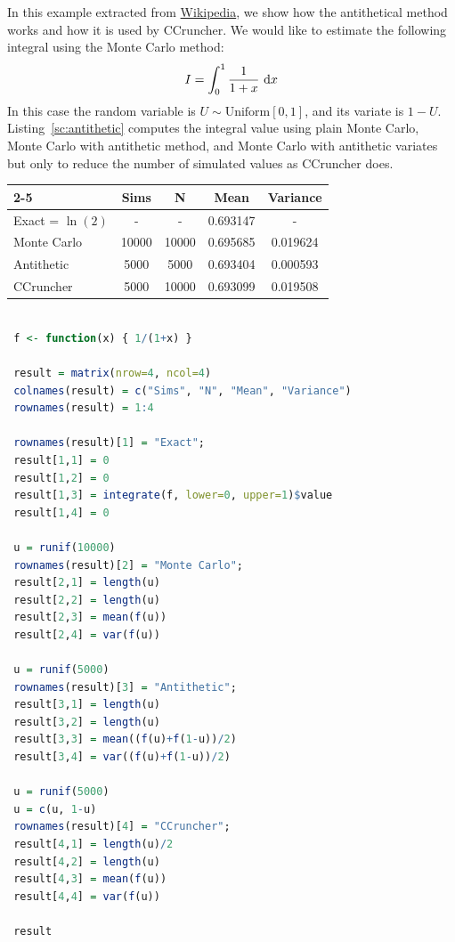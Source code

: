 \documentclass[11pt,fleqn]{book} %
\begin{document}
\begin{example}
	In this example extracted from 
	\href{http://en.wikipedia.org/wiki/Antithetic_variates}{Wikipedia}, we 
	show how the antithetical method works and how it is used by CCruncher. 
	We would like to estimate the following integral using the Monte Carlo 
	method:
	\begin{displaymath}
		I = \displaystyle \int_0^1 \frac{1}{1+x} \mathop{\,\mathrm{{}d}}\mathopen{} x
	\end{displaymath}
	In this case the random variable is $U \sim \text{Uniform}[0,1]$, and 
	its variate is $1-U$. Listing~\ref{sc:antithetic} computes the integral 
	value using plain Monte Carlo, Monte Carlo with antithetic method, and 
	Monte Carlo with antithetic variates but only to reduce the number of 
	simulated values as CCruncher does.
	\\
	\hspace*{1cm}
	\begin{tabular}{l|c|c|c|c|}
		\cline{2-5}
		& Sims & N & Mean & Variance \\
		\hline
		\multicolumn{1}{|l|}{Exact = $\ln(2)$} & - & - & 0.693147 & - \\
		\hline
		\multicolumn{1}{|l|}{Monte Carlo} & 10000 & 10000 & 0.695685 & 0.019624 \\
		\hline
		\multicolumn{1}{|l|}{Antithetic} & 5000 & 5000 & 0.693404 & 0.000593 \\
		\hline
		\multicolumn{1}{|l|}{CCruncher} & 5000 & 10000 & 0.693099 & 0.019508 \\
		\hline
	\end{tabular}
\end{example}

\begin{lstlisting}[language=R, label=sc:antithetic, caption=Antithetic example (R script)]

 f <- function(x) { 1/(1+x) }
 
 result = matrix(nrow=4, ncol=4)
 colnames(result) = c("Sims", "N", "Mean", "Variance")
 rownames(result) = 1:4

 rownames(result)[1] = "Exact";
 result[1,1] = 0
 result[1,2] = 0
 result[1,3] = integrate(f, lower=0, upper=1)$value
 result[1,4] = 0

 u = runif(10000)
 rownames(result)[2] = "Monte Carlo";
 result[2,1] = length(u)
 result[2,2] = length(u)
 result[2,3] = mean(f(u))
 result[2,4] = var(f(u))

 u = runif(5000)
 rownames(result)[3] = "Antithetic";
 result[3,1] = length(u)
 result[3,2] = length(u)
 result[3,3] = mean((f(u)+f(1-u))/2)
 result[3,4] = var((f(u)+f(1-u))/2)

 u = runif(5000)
 u = c(u, 1-u)
 rownames(result)[4] = "CCruncher";
 result[4,1] = length(u)/2
 result[4,2] = length(u)
 result[4,3] = mean(f(u))
 result[4,4] = var(f(u))
 
 result

\end{lstlisting}
\end{document}
